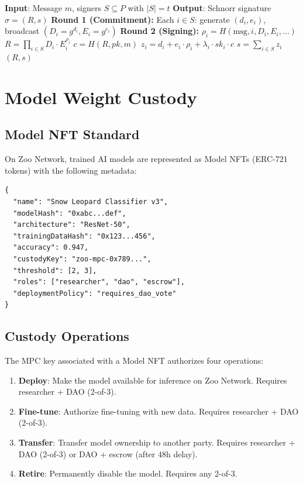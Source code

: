 \documentclass[11pt,letterpaper]{article}
\begin{document}
\begin{algorithm}[t]
\caption{FROST Threshold Signing on Zoo}
\label{alg:frost}
\begin{algorithmic}[1]
\STATE \textbf{Input}: Message $m$, signers $S \subseteq P$ with $|S| = t$
\STATE \textbf{Output}: Schnorr signature $\sigma = (R, s)$
\STATE \textbf{Round 1 (Commitment):}
\STATE Each $i \in S$: generate $(d_i, e_i)$, broadcast $(D_i = g^{d_i}, E_i = g^{e_i})$
\STATE \textbf{Round 2 (Signing):}
\STATE $\rho_i = H(\text{msg}, i, D_i, E_i, \ldots)$
\STATE $R = \prod_{i \in S} D_i \cdot E_i^{\rho_i}$
\STATE $c = H(R, pk, m)$
\STATE $z_i = d_i + e_i \cdot \rho_i + \lambda_i \cdot sk_i \cdot c$
\STATE $s = \sum_{i \in S} z_i$
\RETURN $(R, s)$
\end{algorithmic}
\end{algorithm}

\section{Model Weight Custody}
\label{sec:model-custody}

\subsection{Model NFT Standard}

On Zoo Network, trained AI models are represented as Model NFTs (ERC-721 tokens) with the following metadata:

\begin{lstlisting}[basicstyle=\ttfamily\small,caption=Model NFT Metadata]
{
  "name": "Snow Leopard Classifier v3",
  "modelHash": "0xabc...def",
  "architecture": "ResNet-50",
  "trainingDataHash": "0x123...456",
  "accuracy": 0.947,
  "custodyKey": "zoo-mpc-0x789...",
  "threshold": [2, 3],
  "roles": ["researcher", "dao", "escrow"],
  "deploymentPolicy": "requires_dao_vote"
}
\end{lstlisting}

\subsection{Custody Operations}

The MPC key associated with a Model NFT authorizes four operations:

\begin{enumerate}
    \item \textbf{Deploy}: Make the model available for inference on Zoo Network. Requires researcher + DAO (2-of-3).

    \item \textbf{Fine-tune}: Authorize fine-tuning with new data. Requires researcher + DAO (2-of-3).

    \item \textbf{Transfer}: Transfer model ownership to another party. Requires researcher + DAO (2-of-3) or DAO + escrow (after 48h delay).

    \item \textbf{Retire}: Permanently disable the model. Requires any 2-of-3.
\end{enumerate}
\end{document}
